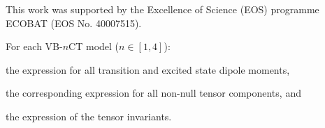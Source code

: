 \documentclass[journal=jpcafh]{achemso}
\begin{document}
\begin{acknowledgement}
	This work was supported by the Excellence of Science (EOS) programme  ECOBAT (EOS No. 40007515). 
\end{acknowledgement}

\begin{suppinfo}
	For each VB-$n$CT model ($n\in[1,4]$): \begin{inparaenum}[i)]
		\item the expression for all transition and excited state dipole moments,
		\item the corresponding expression for all non-null tensor components, and
		\item the expression of the tensor invariants.
	\end{inparaenum}
\end{suppinfo}



\end{document}
